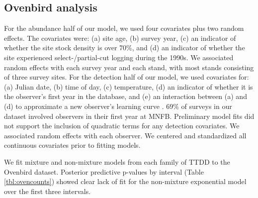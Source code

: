 \documentclass[useAMS,usenatbib,referee,12pt]{article}
\begin{document}
\subsection{Ovenbird analysis}\label{sec:ovenbirdanalysis}

For the abundance half of our model, we used four covariates plus two random effects.  
The covariates were: (a) site age, (b) survey year, (c) an indicator of whether the site stock density is over 70\%, and (d) an indicator of whether the site experienced select-/partial-cut logging during the 1990s.  
We associated random effects with each survey year and each stand, with most stands consisting of three survey sites.  
For the detection half of our model, we used covariates for: (a) Julian date, (b) time of day, (c) temperature, (d) an indicator of whether it is the observer's first year in the database, and (e) an interaction between (a) and (d) to approximate a new observer's learning curve \citep{Alldredge2007}.  
69\% of surveys in our dataset involved observers in their first year at MNFB.  
Preliminary model fits did not support the inclusion of quadratic terms for any detection covariates.  
We associated random effects with each observer.  
We centered and standardized all continuous covariates prior to fitting models.


We fit mixture and non-mixture models from each family of TTDD to the Ovenbird dataset.  
Posterior predictive p-values by interval (Table \ref{tbl:ovencounts}) showed clear lack of fit for the non-mixture exponential model over the first three intervals.  
\end{document}
